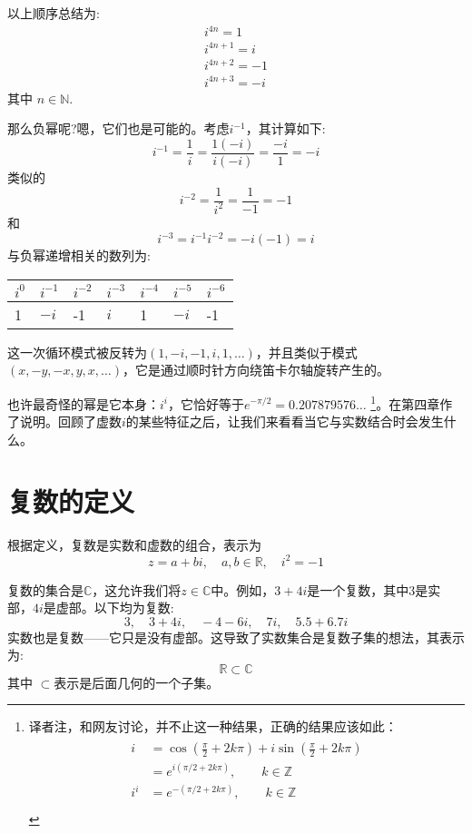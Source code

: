 以上顺序总结为:
$$
\begin{gathered}
i^{4 n}=1 \\
i^{4 n+1}=i \\
i^{4 n+2}=-1 \\
i^{4 n+3}=-i
\end{gathered}
$$
其中 $n \in \mathbb{N}$.

那么负幂呢?嗯，它们也是可能的。考虑$i^{-1}$，其计算如下:
$$
i^{-1}=\frac{1}{i}=\frac{1(-i)}{i(-i)}=\frac{-i}{1}=-i
$$
类似的
$$
i^{-2}=\frac{1}{i^{2}}=\frac{1}{-1}=-1
$$
和
$$
i^{-3}=i^{-1} i^{-2}=-i(-1)=i
$$
与负幂递增相关的数列为:
\begin{center}
\begin{tabular}{lllllll}
\hline
$i^{0}$ & $i^{-1}$ & $i^{-2}$ & $i^{-3}$ & $i^{-4}$ & $i^{-5}$ & $i^{-6}$ \\
\hline
1 & $-i$ & -1 & $i$ & 1 & $-i$ & -1 \\
\hline
\end{tabular}
\end{center}

这一次循环模式被反转为$(1,-i,-1, i, 1, \ldots)$，并且类似于模式$(x,-y,-x, y, x, \ldots)$，它是通过顺时针方向绕笛卡尔轴旋转产生的。

也许最奇怪的幂是它本身：$i^{i}$，它恰好等于$e^{-\pi / 2}= 0.207879576\dots$ \footnote{译者注，和网友讨论，并不止这一种结果，正确的结果应该如此：
\begin{align*}
    \begin{aligned}
        i &=  \cos (\frac{\pi}{2}+2k\pi)+i\sin(\frac{\pi}{2}+2k\pi)\\
        &=e^{i({\pi/2}+2k\pi)},\qquad k\in \mathbb{Z}\\
        i^i &= e^{-(\pi/2+2k\pi)},\qquad k\in \mathbb{Z}\\
    \end{aligned}
\end{align*}
}。在第四章作了说明。回顾了虚数$i$的某些特征之后，让我们来看看当它与实数结合时会发生什么。

\section{复数的定义}
根据定义，复数是实数和虚数的组合，表示为
$$
z=a+b i, \quad a, b \in \mathbb{R}, \quad i^{2}=-1
$$

复数的集合是$\mathbb{C}$，这允许我们将$z \in \mathbb{C}$中。例如，$3+4 i$是一个复数，其中3是实部，$ 4i $是虚部。以下均为复数:
$$
3, \quad 3+4 i, \quad-4-6 i, \quad 7 i, \quad 5.5+6.7 i
$$
实数也是复数——它只是没有虚部。这导致了实数集合是复数子集的想法，其表示为:
$$
\mathbb{R} \subset \mathbb{C}
$$
其中 $\subset$表示是后面几何的一个子集。

